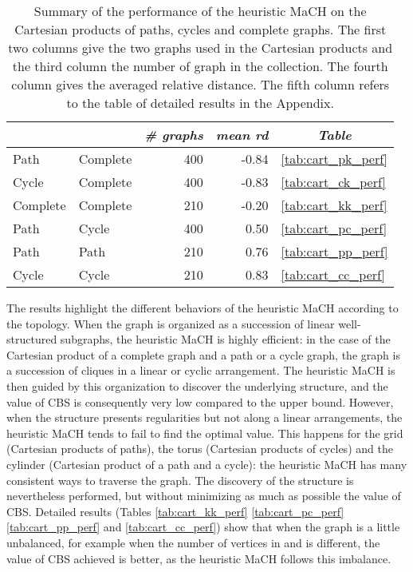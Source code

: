 \documentclass{scrartcl}
\theoremstyle{plain}
\newcommand{\algo}{MaCH}
\newcommand{\cbs}{CBS}
\begin{document}
\begin{table}[!ht]
	\centering
	\small
	\begin{tabular}{|llr|r|l|} 
	\hline
	\multicolumn{1}{|c}{} & 
	\multicolumn{1}{c}{} & 
	\multicolumn{1}{c|}{\emph{\# graphs}} & 
	\multicolumn{1}{c|}{\emph{mean rd}} & 
	\multicolumn{1}{c|}{\emph{Table}} \\ \hline
	
	\makeatletter{}Path & Complete & 400 & -0.84 &\ref{tab:cart_pk_perf} \\ 
Cycle & Complete & 400 & -0.83 &\ref{tab:cart_ck_perf} \\
Complete & Complete & 210 & -0.20 &\ref{tab:cart_kk_perf} \\
Path & Cycle & 400 & 0.50 &\ref{tab:cart_pc_perf} \\ 
Path & Path & 210 & 0.76 &\ref{tab:cart_pp_perf} \\
Cycle & Cycle & 210 & 0.83 &\ref{tab:cart_cc_perf} \\ 
 



 
	\hline
	\end{tabular}
	\caption{\label{tab:perf_cart_sum}Summary of the performance of the 
heuristic \algo{} on the Cartesian products of paths, cycles and complete 
graphs. The first two columns give the two graphs used in the Cartesian 
products 
and the third column the number of graph in the collection. The fourth column 
gives the averaged relative distance. The fifth column refers to the table of 
detailed results in the Appendix.}

\end{table}

The results highlight the different behaviors of the heuristic \algo{} according 
to the topology. When the graph is organized as a succession of linear 
well-structured subgraphs, the heuristic \algo{}  is highly efficient: in the 
case of the Cartesian product of a complete graph and a path or a cycle graph, 
the graph is a succession of cliques in a linear or cyclic arrangement. The 
heuristic \algo{} is then guided by this organization to discover the underlying 
structure, and the value of \cbs{} is consequently very low compared to the 
upper bound. However, when the structure presents regularities but not along a 
linear arrangements, the heuristic \algo{} tends to fail to find the optimal 
value. This happens for the grid (Cartesian products of paths), the torus 
(Cartesian products of cycles) and the cylinder (Cartesian product of a path and 
a cycle): the heuristic \algo{} has many consistent ways to traverse the graph. 
The discovery of the structure is nevertheless performed, but without minimizing 
as much as possible the value of \cbs{}. Detailed results (Tables 
\ref{tab:cart_kk_perf} \ref{tab:cart_pc_perf} \ref{tab:cart_pp_perf} and 
\ref{tab:cart_cc_perf}) show that when the graph is a little unbalanced, for 
example when the number of vertices in  and  is different, the value of 
\cbs{} achieved is better, as the heuristic \algo{} follows this imbalance.
\end{document}
